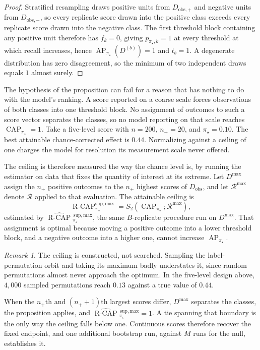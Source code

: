 \documentclass[11pt]{article}
\newcommand{\AP}{\operatorname{AP}}
\newcommand{\CAP}{\operatorname{CAP}}
\newcommand{\Regime}{\mathcal{R}}
\newcommand{\Tpi}{\CAP_{\pi_\star}}
\newcommand{\RegimeMax}{\Regime^{\max}}
\newcommand{\RCAPmax}{\operatorname{R\text{-}CAP}^{\mathrm{sup,max}}_{\pi_\star}}
\newcommand{\RCAPmaxHat}{\widehat{\operatorname{R\text{-}CAP}}{}^{\,\mathrm{sup,max}}_{\pi_\star}}
\theoremstyle{remark}
\newtheorem*{remark}{Remark}
\begin{document}
\begin{proof}
Stratified resampling draws positive units from $D_{\mathrm{obs},+}$ and negative units from $D_{\mathrm{obs},-}$, so every replicate score drawn into the positive class exceeds every replicate score drawn into the negative class. The first threshold block containing any positive unit therefore has $f_k=0$, giving $p_{\pi_\star,k}=1$ at every threshold at which recall increases, hence $\AP_{\pi_\star}(D^{(b)})=1$ and $t_b=1$. A degenerate distribution has zero disagreement, so the minimum of two independent draws equals $1$ almost surely.
\end{proof}

The hypothesis of the proposition can fail for a reason that has nothing to do with the model's ranking. A score reported on a coarse scale forces observations of both classes into one threshold block. No assignment of outcomes to such a score vector separates the classes, so no model reporting on that scale reaches $\Tpi=1$. Take a five-level score with $n=200$, $n_+=20$, and $\pi_\star=0.10$. The best attainable chance-corrected effect is $0.44$. Normalizing against a ceiling of one charges the model for resolution its measurement scale never offered.

The ceiling is therefore measured the way the chance level is, by running the estimator on data that fixes the quantity of interest at its extreme. Let $D^{\max}$ assign the $n_+$ positive outcomes to the $n_+$ highest scores of $D_{\mathrm{obs}}$, and let $\RegimeMax$ denote $\Regime$ applied to that evaluation. The attainable ceiling is
\begin{equation}
\RCAPmax
=
S_2(\Tpi;\RegimeMax),
\label{eq:ceiling-estimand}
\end{equation}
estimated by $\RCAPmaxHat$, the same $B$-replicate procedure run on $D^{\max}$. That assignment is optimal because moving a positive outcome into a lower threshold block, and a negative outcome into a higher one, cannot increase $\AP_{\pi_\star}$.

\begin{remark}
The ceiling is constructed, not searched. Sampling the label-permutation orbit and taking its maximum badly understates it, since random permutations almost never approach the optimum. In the five-level design above, $4{,}000$ sampled permutations reach $0.13$ against a true value of $0.44$.
\end{remark}

When the $n_+$th and $(n_++1)$th largest scores differ, $D^{\max}$ separates the classes, the proposition applies, and $\RCAPmaxHat=1$. A tie spanning that boundary is the only way the ceiling falls below one. Continuous scores therefore recover the fixed endpoint, and one additional bootstrap run, against $M$ runs for the null, establishes it.
\end{document}
